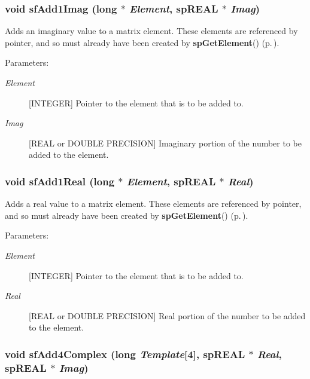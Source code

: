 \subsubsection{\setlength{\rightskip}{0pt plus 5cm}void sf\-Add1Imag (long $\ast$ {\em Element}, sp\-REAL $\ast$ {\em Imag})}\label{spFortran_8c_a56}


Adds an imaginary value to a matrix element. These elements are referenced by pointer, and so must already have been created by {\bf sp\-Get\-Element}() {\rm (p.\,\pageref{spBuild_8c_a12})}.\begin{Desc}
\item[Parameters: ]\par
\begin{description}
\item[{\em 
Element}][INTEGER] Pointer to the element that is to be added to. \item[{\em 
Imag}][REAL or DOUBLE PRECISION] Imaginary portion of the number to be added to the element. \end{description}
\end{Desc}
\subsubsection{\setlength{\rightskip}{0pt plus 5cm}void sf\-Add1Real (long $\ast$ {\em Element}, sp\-REAL $\ast$ {\em Real})}\label{spFortran_8c_a55}


Adds a real value to a matrix element. These elements are referenced by pointer, and so must already have been created by {\bf sp\-Get\-Element}() {\rm (p.\,\pageref{spBuild_8c_a12})}.\begin{Desc}
\item[Parameters: ]\par
\begin{description}
\item[{\em 
Element}][INTEGER] Pointer to the element that is to be added to. \item[{\em 
Real}][REAL or DOUBLE PRECISION] Real portion of the number to be added to the element. \end{description}
\end{Desc}
\subsubsection{\setlength{\rightskip}{0pt plus 5cm}void sf\-Add4Complex (long {\em Template}[4], sp\-REAL $\ast$ {\em Real}, sp\-REAL $\ast$ {\em Imag})}\label{spFortran_8c_a60}


